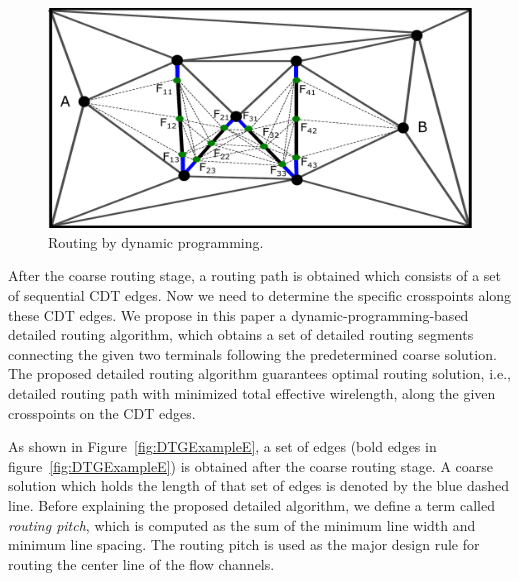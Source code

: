 \documentclass[journal]{IEEEtran}
\begin{document}
\begin{figure}[htbp]
\centering
\includegraphics[width=0.9\columnwidth, angle=0]{./Figs/DP.pdf}
\vspace{-0.15cm}
\caption{Routing by dynamic programming.}
\label{fig:dp}
\end{figure}

After the coarse routing stage, a routing path is obtained which consists of a set of sequential CDT edges. 
Now we need to determine the specific crosspoints along these CDT edges. 
We propose in this paper a dynamic-programming-based detailed routing algorithm, which obtains a set of detailed routing segments connecting the given two terminals following the predetermined coarse solution. 
The proposed detailed routing algorithm guarantees optimal routing solution,
i.e., detailed routing path with minimized total effective wirelength,
along the given crosspoints on the CDT edges. 

As shown in Figure~\ref{fig:DTGExampleE}, a set of edges (bold edges in figure~\ref{fig:DTGExampleE}) is obtained after the coarse routing stage. A coarse solution which holds the length of that set of edges is denoted by the blue dashed line.
Before explaining the proposed detailed algorithm, we define a term called {\em routing pitch}, which is computed as the sum of the minimum line width and minimum line spacing. 
The routing pitch is used as the major design rule for routing the center line of the flow channels. 
\end{document}
